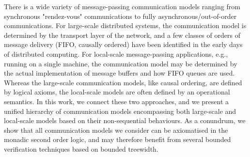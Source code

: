 There is a wide variety of message-passing communication models ranging from synchronous "rendez-vous" 
communications to fully asynchronous/out-of-order communications. For large-scale distributed systems, the
communication model is determined by the transport layer of the network, and a few classes of 
orders of message delivery (FIFO, causally ordered) have been identified in the early days of 
distributed computing. For local-scale message-passing applications, 
e.g., running on a single machine, the communication model may be determined by the actual implementation of 
message buffers and how FIFO queues are used. Whereas the large-scale communication
models, like causal ordering, are defined by logical axioms, the local-scale models are often defined by an operational
semantics. In this work, we connect these two approaches, and we present a unified hierarchy of communication
models encompassing both large-scale and local-scale models based on their non-sequential behaviours.
As a conundrum, we show that all communication models we consider can be axiomatised in the monadic second order logic,
and may therefore benefit from several bounded verification techniques based on bounded treewidth.